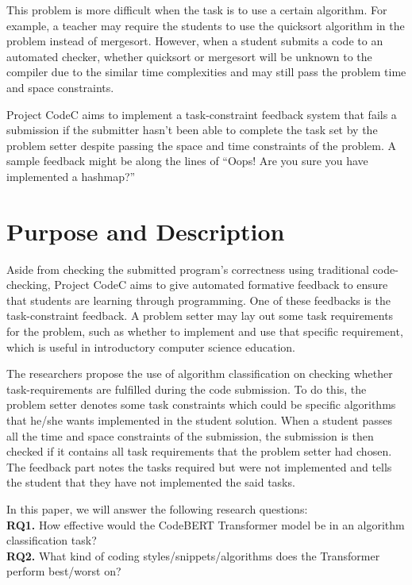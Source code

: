 This problem is more difficult when the task is to use a certain algorithm. For example, 
a teacher may require the students to use the quicksort algorithm in the problem instead 
of mergesort. However, when a student submits a code to an automated checker, whether 
quicksort or mergesort will be unknown to the compiler due to the similar time complexities 
and may still pass the problem time and space constraints. 

Project CodeC aims to implement a task-constraint feedback system that fails a submission 
if the submitter hasn’t been able to complete the task set by the problem setter despite 
passing the space and time constraints of the problem. A sample feedback might be along the 
lines of “Oops! Are you sure you have implemented a hashmap?”


\section{Purpose and Description}
Aside from checking the submitted program’s correctness using traditional code-checking, 
Project CodeC aims to give automated formative feedback to ensure that students are 
learning through programming. One of these feedbacks is the task-constraint feedback. 
A problem setter may lay out some task requirements for the problem, such as whether to 
implement and use that specific requirement, which is useful in introductory computer 
science education.

The researchers propose the use of algorithm classification on checking whether task-requirements 
are fulfilled during the code submission. To do this, the problem setter denotes some task 
constraints which could be specific algorithms that he/she wants implemented in the student 
solution. When a student passes all the time and space constraints of the submission, the submission 
is then checked if it contains all task requirements that the problem setter had chosen. 
The feedback part notes the tasks required but were not implemented and tells the student 
that they have not implemented the said tasks. 

In this paper, we will answer the following research questions:\\
\textbf{RQ1.} How effective would the CodeBERT Transformer model be in an algorithm classification task?\\

\textbf{RQ2.} What kind of coding styles/snippets/algorithms does the Transformer perform best/worst on?

